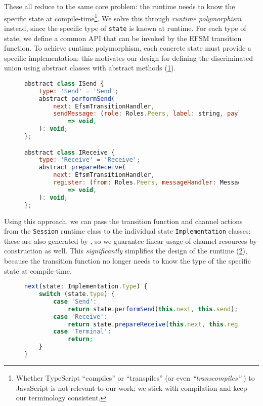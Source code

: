 These all reduce to the same core problem: the runtime
needs to know the specific state at compile-time\footnote{
Whether TypeScript ``compiles'' or ``transpiles''
(or even \textit{``transcompiles''} \cite{transcompiles}) to JavaScript
is not relevant to our work; we stick with compilation
and keep our terminology consistent.}.
We solve this through \textit{runtime polymorphism} instead, since
the specific type of \texttt{state} is known at runtime.
For each type of state, we define a common API that can be invoked
by the EFSM transition function. To achieve runtime polymorphism,
each concrete state must provide a specific implementation: 
this motivates our design for defining the discriminated union
using abstract classes with abstract methods 
(\cref{lst:nodeabstractclass}).

\begin{figure}[!h]
\begin{lstlisting}[language=javascript,tabsize=2]
abstract class ISend {
	type: 'Send' = 'Send';
	abstract performSend(
		next: EfsmTransitionHandler,
		sendMessage: (role: Roles.Peers, label: string, payload: any[])
			=> void,
	): void;
};

abstract class IReceive {
	type: 'Receive' = 'Receive';
	abstract prepareReceive(
		next: EfsmTransitionHandler,
		register: (from: Roles.Peers, messageHandler: MessageHandler)
			=> void,
	): void;
};
\end{lstlisting}
\label{lst:nodeabstractclass}
\end{figure}

Using this approach,
we can pass the transition function and channel actions 
from the \texttt{Session} runtime class
to the individual state \texttt{Implementation} classes:
these are also generated by , so we
guarantee linear usage of channel resources by construction as well.
This \textit{significantly} simplifies the design of the runtime
(\cref{lst:noderuntime}),
because the transition function no longer needs to know the type 
of the specific state at compile-time.

\begin{figure}[!h]
\begin{lstlisting}[language=javascript,tabsize=2]
next(state: Implementation.Type) {
	switch (state.type) {
		case 'Send':
			return state.performSend(this.next, this.send);
		case 'Receive':
			return state.prepareReceive(this.next, this.register);
		case 'Terminal':
			return;
	}
}
\end{lstlisting}
\label{lst:noderuntime}
\end{figure}

